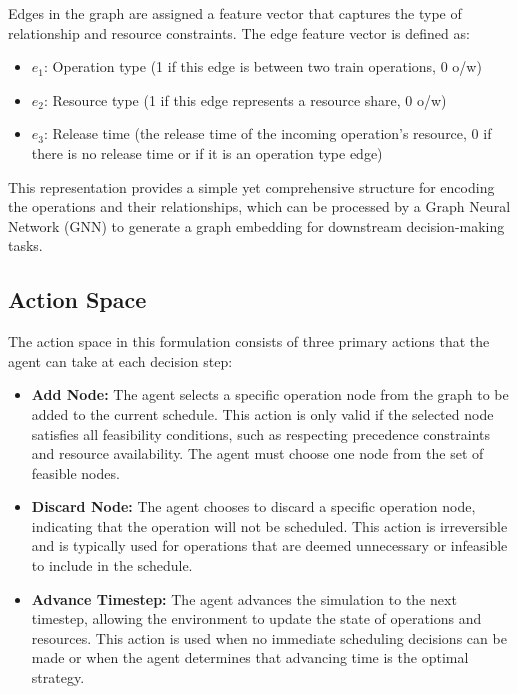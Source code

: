 \documentclass[runningheads]{llncs}
\begin{document}
Edges in the graph are assigned a feature vector that captures the type of relationship and resource constraints. 
The edge feature vector is defined as:
\begin{itemize}
    \item $e_1$: Operation type (1 if this edge is between two train operations, 0 o/w)
    \item $e_2$: Resource type (1 if this edge represents a resource share, 0 o/w)
    \item $e_3$: Release time (the release time of the incoming operation's resource, 0 if there is no release time or if it is an operation type edge)
\end{itemize}

This representation provides a simple yet comprehensive structure for encoding the operations and their relationships, which can be processed by a Graph Neural Network (GNN) to generate a graph embedding for downstream decision-making tasks.

\subsection{Action Space}
\label{sss:action_space}
The action space in this formulation consists of three primary actions that the agent can take at each decision step:

\begin{itemize}
    \item \textbf{Add Node:} The agent selects a specific operation node from the graph to be added to the current schedule. This action is only valid if the selected node satisfies all feasibility conditions, such as respecting precedence constraints and resource availability. The agent must choose one node from the set of feasible nodes.

    \item \textbf{Discard Node:} The agent chooses to discard a specific operation node, indicating that the operation will not be scheduled. This action is irreversible and is typically used for operations that are deemed unnecessary or infeasible to include in the schedule.

    \item \textbf{Advance Timestep:} The agent advances the simulation to the next timestep, allowing the environment to update the state of operations and resources. This action is used when no immediate scheduling decisions can be made or when the agent determines that advancing time is the optimal strategy.
\end{itemize}
\end{document}
